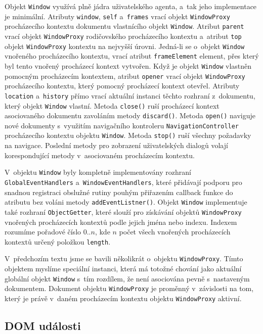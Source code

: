 Objekt \texttt{Window} využívá plně jádra uživatelského agenta, a~tak jeho implementace je minimální. Atributy \texttt{window}, \texttt{self} a~\texttt{frames} vrací objekt \texttt{WindowProxy} procházecího kontextu dokumentu vlastnícího objekt \texttt{Window}. Atribut \texttt{parent} vrací objekt \texttt{WindowProxy} rodičovského procházecího kontextu a~atribut \texttt{top} objekt \texttt{WindowProxy} kontextu na nejvyšší úrovni. Jedná-li se o~objekt \texttt{Window} vnořeného procházecího kontextu, vrací atribut \texttt{frameElement} element, přes který byl tento vnořený procházecí kontext vytvořen. Když je objekt \texttt{Window} vlastněn pomocným procházecím kontextem, atribut \texttt{opener} vrací objekt \texttt{WindowProxy} procházecího kontextu, který pomocný procházecí kontext otevřel. Atributy \texttt{location} a~\texttt{history} přímo vrací aktuální instanci těchto rozhraní z~dokumentu, který objekt \texttt{Window} vlastní. Metoda \texttt{close()} ruší procházecí kontext asociovaného dokumentu zavoláním metody \texttt{discard()}. Metoda \texttt{open()} naviguje nové dokumenty s~využitím navigačního kontroleru \texttt{NavigationController} procházecího kontextu objektu \texttt{Window}. Metoda \texttt{stop()} ruší všechny požadavky na navigace. Poslední metody pro zobrazení uživatelských dialogů volají korespondující metody v~asociovaném procházecím kontextu. 

V~objektu \texttt{Window} byly kompletně implementovány rozhraní \texttt{GlobalEventHandlers} a~\texttt{WindowEventHandlers}, které přidávají podporu pro snadnou registraci obslužné rutiny pouhým přiřazením callback funkce do atributu bez voláni metody \texttt{addEventListner()}. Objekt \texttt{Window} implementuje také rozhraní \texttt{ObjectGetter}, které slouží pro získávání objektů \texttt{WindowProxy} vnořených procházecích kontextů podle jejich jména nebo indexu. Indexem rozumíme pořadové číslo $0..n$, kde $n$ počet všech vnořených procházecích kontextů určený položkou \texttt{length}.

V~předchozím textu jsme se bavili několikrát o~objektu \texttt{WindowProxy}. Tímto objektem myslíme speciální instanci, která má totožné chování jako aktuální globální objekt \texttt{Window} s~tím rozdílem, že není asociována pevně s~nastaveným dokumentem. Dokument objektu \texttt{WindowProxy} je proměnný v~závislosti na tom, který je právě v~daném procházecím kontextu objektu \texttt{WindowProxy} aktivní. 

\subsection{DOM události}
\label{Chapter.Implementation.DOMEvents}

